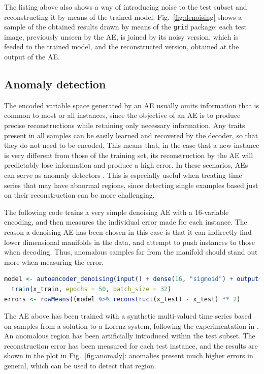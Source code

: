 \documentclass[
	fontsize=11pt, %
	twoside=false, %
	open=any, %
	secnumdepth=1, %
]{kaobook}
\begin{document}
The listing above also shows a way of introducing noise to the test subset and reconstructing it by means of the trained model. Fig.~\ref{fig:denoising} shows a sample of the obtained results drawn by means of the \texttt{grid} package: each test image, previously unseen by the AE, is joined by its noisy version, which is feeded to the trained model, and the reconstructed version, obtained at the output of the AE.


\subsection{Anomaly detection}
\label{sec.anomaly}

The encoded variable space generated by an AE usually omits information that is common to most or all instances, since the objective of an AE is to produce precise reconstructions while retaining only necessary information. Any traits present in all samples can be easily learned and recovered by the decoder, so that they do not need to be encoded. This means that, in the case that a new instance is very different from those of the training set, its reconstruction by the AE will predictably lose information and produce a high error. In these scenarios, AEs can serve as anomaly detectors \cite{sakurada,park}. This is especially useful when treating time series that may have abnormal regions, since detecting single examples based just on their reconstruction can be more challenging.

The following code trains a very simple denoising AE with a 16-variable encoding, and then measures the individual error made for each instance. The reason a denoising AE has been chosen in this case is that it can indirectly find lower dimensional manifolds in the data, and attempt to push instances to those when decoding. Thus, anomalous samples far from the manifold should stand out more when measuring the error.

\begin{lstlisting}[language=R]
model <- autoencoder_denoising(input() + dense(16, "sigmoid") + output()) %>% 
  train(x_train, epochs = 50, batch_size = 32)
errors <- rowMeans((model %>% reconstruct(x_test) - x_test) ** 2)
\end{lstlisting}

The AE above has been trained with a synthetic multi-valued time series based on samples from a solution to a Lorenz system, following the experimentation in \cite{sakurada}. An anomalous region has been artificially introduced within the test subset. The reconstruction error has been measured for each test instance, and the results are shown in the plot in Fig.~\ref{fig:anomaly}: anomalies present much higher errors in general, which can be used to detect that region.
\end{document}

